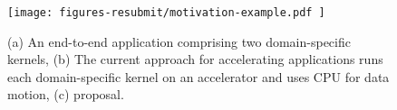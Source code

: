 \begin{figure}[ht!]
    \centering
    \texttt{[image: figures-resubmit/motivation-example.pdf ]}
    \caption{
    (a) An end-to-end application comprising two domain-specific kernels, (b) The current approach for accelerating applications runs each domain-specific kernel on an accelerator and uses CPU for data motion, (c) \dmx proposal. %
    }
    \label{fig:motiv-ex}
    \vspace{-2ex}
\end{figure}